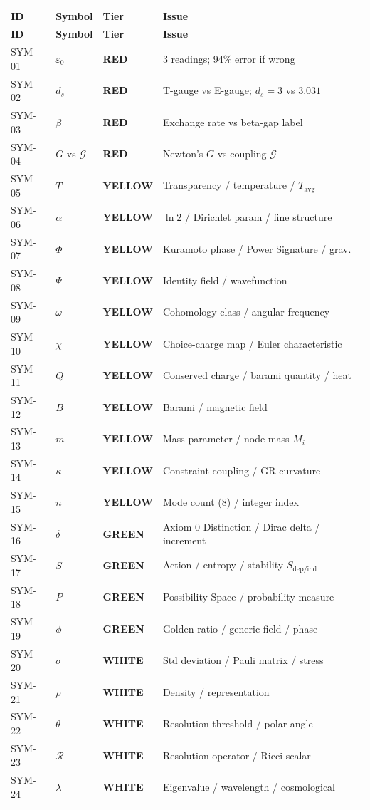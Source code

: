 \documentclass[12pt, a4paper]{article}
\newcommand{\TRED}{\textcolor{redframe}{\textbf{RED}}}
\newcommand{\TYELLOW}{\textcolor{yellowframe}{\textbf{YELLOW}}}
\newcommand{\TGREEN}{\textcolor{greenframe}{\textbf{GREEN}}}
\newcommand{\TWHITE}{\textcolor{whiteframe}{\textbf{WHITE}}}
\begin{document}
\begin{center}
{\small
\renewcommand{\arraystretch}{1.40}
\setlength{\LTpre}{4pt}
\setlength{\LTpost}{4pt}
\begin{longtable}{p{1.2cm} p{3.6cm} p{4.0cm} p{5.0cm}}
\toprule
\textbf{ID} & \textbf{Symbol} & \textbf{Tier} & \textbf{Issue}\\
\midrule
\endfirsthead
\toprule
\textbf{ID} & \textbf{Symbol} & \textbf{Tier} & \textbf{Issue}\\
\midrule
\endhead
\bottomrule
\endlastfoot
SYM-01 & $\varepsilon_0$ & \TRED & 3 readings; 94\% error if wrong\\
SYM-02 & $d_s$ & \TRED & T-gauge vs E-gauge; $d_s=3$ vs $3.031$\\
SYM-03 & $\beta$ & \TRED & Exchange rate vs beta-gap label\\
SYM-04 & $G$ vs $\mathcal{G}$ & \TRED & Newton's $G$ vs coupling $\mathcal{G}$\\
SYM-05 & $T$ & \TYELLOW & Transparency / temperature / $T_{\text{avg}}$\\
SYM-06 & $\alpha$ & \TYELLOW & $\ln 2$ / Dirichlet param / fine structure\\
SYM-07 & $\Phi$ & \TYELLOW & Kuramoto phase / Power Signature / grav.\\
SYM-08 & $\Psi$ & \TYELLOW & Identity field / wavefunction\\
SYM-09 & $\omega$ & \TYELLOW & Cohomology class / angular frequency\\
SYM-10 & $\chi$ & \TYELLOW & Choice-charge map / Euler characteristic\\
SYM-11 & $Q$ & \TYELLOW & Conserved charge / barami quantity / heat\\
SYM-12 & $B$ & \TYELLOW & Barami / magnetic field\\
SYM-13 & $m$ & \TYELLOW & Mass parameter / node mass $M_i$\\
SYM-14 & $\kappa$ & \TYELLOW & Constraint coupling / GR curvature\\
SYM-15 & $n$ & \TYELLOW & Mode count (8) / integer index\\
SYM-16 & $\delta$ & \TGREEN & Axiom 0 Distinction / Dirac delta / increment\\
SYM-17 & $S$ & \TGREEN & Action / entropy / stability $S_{\text{dep/ind}}$\\
SYM-18 & $P$ & \TGREEN & Possibility Space / probability measure\\
SYM-19 & $\phi$ & \TGREEN & Golden ratio / generic field / phase\\
SYM-20 & $\sigma$ & \TWHITE & Std deviation / Pauli matrix / stress\\
SYM-21 & $\rho$ & \TWHITE & Density / representation\\
SYM-22 & $\theta$ & \TWHITE & Resolution threshold / polar angle\\
SYM-23 & $\mathcal{R}$ & \TWHITE & Resolution operator / Ricci scalar\\
SYM-24 & $\lambda$ & \TWHITE & Eigenvalue / wavelength / cosmological\\
\end{longtable}
}
\end{center}
\end{document}
